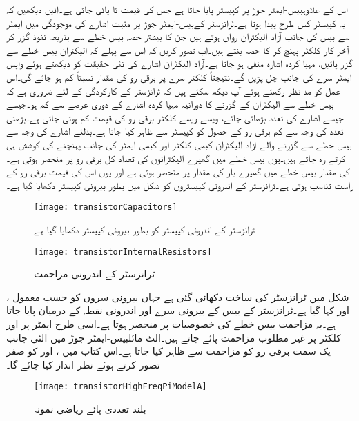 اس کے علاوہبیس-ایمٹر    جوڑ پر  کپیسٹر  پایا جاتا ہے جس کی قیمت  تا  پائی جاتی ہے۔آئیں دیکھیں کہ یہ کپیسٹر کس طرح پیدا ہوتا ہے۔ٹرانزسٹر کےبیس-ایمٹر    جوڑ پر  مثبت اشارے  کی موجودگی میں ایمٹر    سے بیس  کی جانب آزاد الیکٹران رواں ہوتے ہیں جن کا بیشتر حصہ بیس  خطے سے بذریعہ نفوذ گزر کر آخر کار کلکٹر  پہنچ  کر  کا حصہ بنتے ہیں۔اب تصور کریں کہ اس سے پہلے کہ الیکٹران بیس  خطے سے گزر پائیں، مہیا کردہ اشارہ  منفی ہو جاتا ہے۔آزاد الیکٹران اشارے کی نئی حقیقت کو دیکھتے ہوئے واپس ایمٹر     سرے کی جانب چل پڑیں گے۔نتیجتاً کلکٹر  سرے پر برقی رو  کی مقدار نسبتاً کم ہو جائے گی۔اس عمل کو مد نظر رکھتے ہوئے آپ دیکھ سکتے ہیں کہ ٹرانزسٹر کے کارکردگی کے لئے ضروری ہے کہ بیس  خطے سے الیکٹران کے گزرنے کا دورانیہ مہیا کردہ اشارے  کے دوری عرصے سے کم ہو۔جیسے جیسے اشارے کی تعدد بڑھائی جائے، ویسے ویسے کلکٹر  برقی رو  کی قیمت کم ہوتی جاتی ہے۔بڑھتی تعدد کی وجہ سے کم برقی رو کے حصول کو کپیسٹر  سے ظاہر کیا جاتا ہے۔بدلتے اشارے کی وجہ سے بیس  خطے سے گزرنے والے آزاد الیکٹران کبھی کلکٹر  اور کبھی ایمٹر    کی جانب پہنچنے کی کوشش ہی کرتے رہ جاتے ہیں۔یوں بیس  خطے میں گھیرے الیکٹرانوں کی تعداد کل برقی رو  پر منحصر ہوتی ہے۔ کی مقدار بیس  خطے میں گھیرے بار کی مقدار پر منحصر ہوتی ہے اور یوں اس کی قیمت برقی رو کے راست تناسب ہوتی ہے۔ٹرانزسٹر کے اندرونی کپیسٹروں کو شکل  میں بطور بیرونی کپیسٹر دکھایا گیا ہے۔
\begin{figure}
\centering
\texttt{[image: transistorCapacitors]}
\caption{ٹرانزسٹر کے اندرونی کپیسٹر کو بطور بیرونی کپیسٹر دکھایا گیا ہے}
\label{شکل_تعددی_ردعمل_اندرونی_کپیسٹر}
\end{figure}
%
\begin{figure}
\centering
\texttt{[image: transistorInternalResistors]}
\caption{ٹرانزسٹر کے اندرونی مزاحمت}
\label{شکل_تعددی_ردعمل_اندرونی_مزاحمت}
\end{figure}

شکل  میں ٹرانزسٹر کی ساخت دکھائی گئی ہے جہاں بیرونی سروں کو حسب معمول ،  اور  کہا گیا ہے۔ٹرانزسٹر کے بیس  کے بیرونی سرے  اور اندرونی نقطہ  کے درمیان   پایا جاتا ہے۔یہ مزاحمت بیس  خطے کی خصوصیات پر منحصر ہوتا ہے۔اسی طرح ایمٹر    پر  اور کلکٹر  پر  غیر مطلوب مزاحمت پائے جاتے ہیں۔الٹ مائلبیس-ایمٹر    جوڑ میں الٹی جانب یک سمت  برقی رو کو مزاحمت  سے ظاہر کیا جاتا ہے۔اس کتاب میں ، اور  کو صفر تصور کرتے ہوئے نظر انداز کیا جائے گا۔  
\begin{figure}
\centering
\texttt{[image: transistorHighFreqPiModelA]}
\caption{بلند تعددی پائے ریاضی نمونہ }
\label{شکل_تعددی_ردعمل_بلند_تعددی_ماڈل_الف}
\end{figure}

